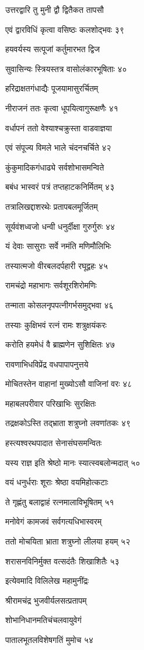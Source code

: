 उत्तरद्वारि तु मुनी द्वौ द्वितैकत तापसौ

एवं द्वारविधिं कृत्वा वसिष्ठः कलशोद्भवः ३९

हयवर्यस्य सत्पूजां कर्तुमारभत द्विज

सुवासिन्यः स्त्रियस्तत्र वासोलंकारभूषिताः ४०

हरिद्राक्षतगंधाद्यैः पूजयामासुरर्चितम्

नीराजनं ततः कृत्वा धूपयित्वागुरूक्षणैः ४१

वर्धापनं ततो वेश्याश्चक्रुस्ता वाडवाज्ञया

एवं संपूज्य विमले भाले चंदनचर्चिते ४२

कुंकुमादिकगंधाढ्ये सर्वशोभासमन्विते

बबंध भास्वरं पत्रं तप्तहाटकनिर्मितम् ४३

तत्रालिखद्दाशरथेः प्रतापबलमूर्जितम्

सूर्यवंशध्वजो धन्वी धनुर्दीक्षा गुरुर्गुरुः ४४

यं देवाः सासुराः सर्वे नमंति मणिमौलिभिः

तस्यात्मजो वीरबलदर्पहारी रघूद्वहः ४५

रामचंद्रो महाभागः सर्वशूरशिरोमणिः

तन्माता कोसलनृपपत्नीगर्भसमुद्भवा ४६

तस्याः कुक्षिभवं रत्नं रामः शत्रुक्षयंकरः

करोति हयमेधं वै ब्राह्मणेन सुशिक्षितः ४७

रावणाभिधविप्रेंद्र वधपापापनुत्तये

मोचितस्तेन वाहानां मुख्योऽसौ वाजिनां वरः ४८

महाबलपरीवार परिखाभिः सुरक्षितः

तद्रक्षकोऽस्ति तद्भ्राता शत्रुघ्नो लवणांतकः ४९

हस्त्यश्वरथपादात सेनासंघसमन्वितः

यस्य राज्ञ इति श्रेष्ठो मानः स्यात्स्वबलोन्मदात् ५०

वयं धनुर्धराः शूराः श्रेष्ठा वयमिहोत्कटाः

ते गृह्णंतु बलाद्वाहं रत्नमालाविभूषितम् ५१

मनोवेगं कामजवं सर्वगत्यधिभास्वरम्

ततो मोचयिता भ्राता शत्रुघ्नो लीलया हयम् ५२

शरासनविनिर्मुक्त वत्सदंतैः शिखाशितैः ५३

इत्येवमादि विलिलेख महामुनींद्रः

श्रीरामचंद्र भुजवीर्यलसत्प्रतापम्

शोभानिधानमतिचंचलवायुवेगं

पातालभूतलविशेषगतिं मुमोच ५४

